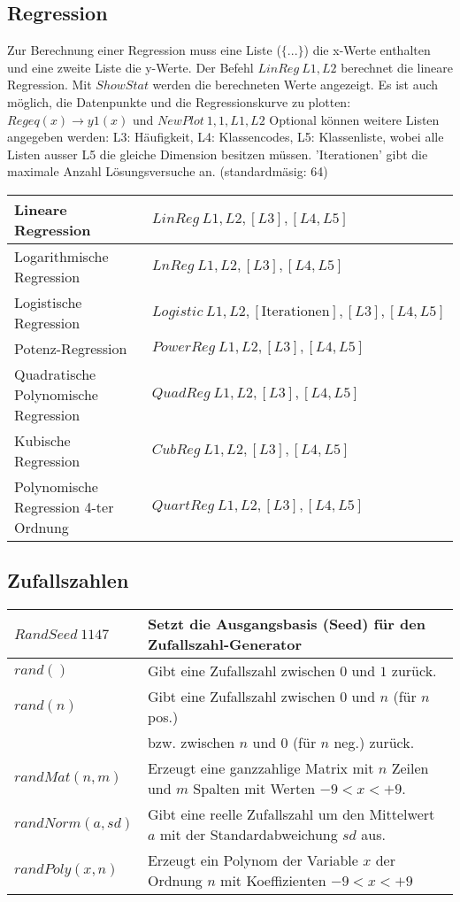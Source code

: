 \subsection{Regression}
Zur Berechnung einer Regression muss eine Liste ($\{...\}$) die x-Werte enthalten 
und eine zweite Liste die y-Werte. Der Befehl $LinReg \: L1,L2$ berechnet die lineare 
Regression. Mit $ShowStat$ werden die berechneten Werte angezeigt. 
Es ist auch möglich, die Datenpunkte und die Regressionskurve zu plotten: 
$Regeq(x) \to y1(x)$ und $NewPlot \: 1,1,L1,L2$ Optional können weitere Listen 
angegeben werden: L3: Häufigkeit, L4: Klassencodes,  L5: Klassenliste, wobei alle Listen ausser 
L5 die gleiche Dimension besitzen müssen. 'Iterationen' gibt die maximale Anzahl Lösungsversuche an. 
(standardmäsig: 64)\\

\begin{tabular}{|l|l|}
	\hline
	Lineare Regression						&	$LinReg \: L1,L2,[L3],[L4,L5]$ \\ \hline
	Logarithmische Regression				&	$LnReg \: L1,L2,[L3],[L4,L5]$ \\ \hline
	Logistische Regression					&	$Logistic \: L1,L2,[\text{Iterationen}],[L3],[L4,L5]$\\ \hline
	Potenz-Regression						&	$PowerReg \: L1,L2,[L3],[L4,L5]$ \\ \hline
	Quadratische Polynomische Regression	&	$QuadReg \: L1,L2,[L3],[L4,L5]$ \\ \hline
	Kubische Regression						&	$CubReg \: L1,L2,[L3],[L4,L5]$ \\ \hline
	Polynomische Regression 4-ter Ordnung	&	$QuartReg \: L1,L2,[L3],[L4,L5]$ \\ \hline
\end{tabular}

\subsection{Zufallszahlen}
\begin{tabular}{|l|l|}
	\hline
	$RandSeed \: 1147$					& Setzt die Ausgangsbasis (Seed) für den Zufallszahl-Generator \\ \hline
	$rand()$							& Gibt eine Zufallszahl zwischen $0$ und $1$ zurück. \\
	$rand(n)$							& Gibt eine Zufallszahl zwischen $0$ und $n$ (für $n$ pos.) \\ 
										& bzw. zwischen $n$ und $0$ (für $n$ neg.) zurück. \\ \hline
	$randMat(n,m)$						& Erzeugt eine ganzzahlige Matrix mit $n$ Zeilen und $m$ Spalten mit Werten $-9<x<+9$. \\ \hline
	$randNorm(a,sd)$					& Gibt eine reelle Zufallszahl um den Mittelwert $a$ mit der Standardabweichung $sd$ aus. \\ \hline
	$randPoly(x,n)$						& Erzeugt ein Polynom der Variable $x$ der Ordnung $n$ mit Koeffizienten $-9<x<+9$ \\ \hline
\end{tabular}